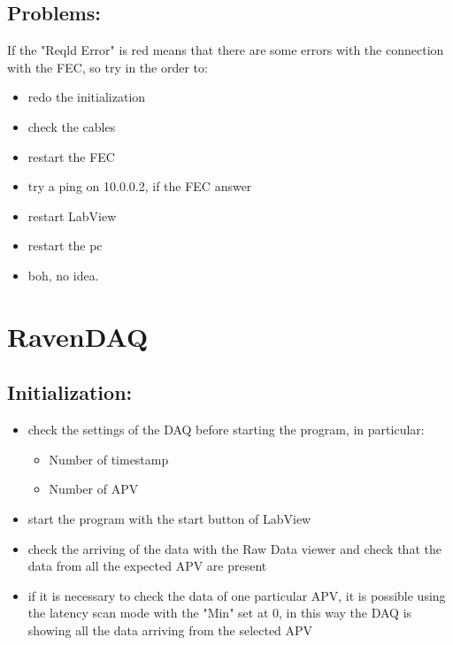 \documentclass[a4paper,12pt]{article}
\begin{document}
		\subsection{Problems:}
			If the "Reqld Error" is red means that there are some errors with the connection with the FEC, so try in the order to:
			\begin{itemize}
				\item redo the initialization
				\item check the cables
				\item restart the FEC
				\item try a ping on 10.0.0.2, if the FEC answer
				\item restart LabView
				\item restart the pc
				\item boh, no idea.
			\end{itemize}

	\section{RavenDAQ}
		\subsection{Initialization:}
			\begin{itemize}
				\item check the settings of the DAQ before starting the program, in particular:
				\begin{itemize}
			 		\item Number of timestamp
			 		\item Number of APV
				\end{itemize}
				\item start the program with the start button of LabView
				\item check the arriving of the data with the Raw Data viewer and check that the data from all the expected APV are present
				\item if it is necessary to check the data of one particular APV, it is possible using the latency scan mode with the "Min" set at 0, in this way the DAQ is showing all the data arriving from the selected APV
			\end{itemize}
\end{document}
